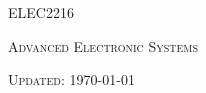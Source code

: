 \documentclass[a4paper,11pt]{article}
\begin{document}

\begin{center}
    {\scshape\huge ELEC2216\par} \vspace{0.5cm}
    {\scshape\Large Advanced Electronic Systems\par} \vspace{2cm}
    {\scshape Updated: \today}
\end{center}
\pagebreak

\tableofcontents \pagebreak





\end{document}
